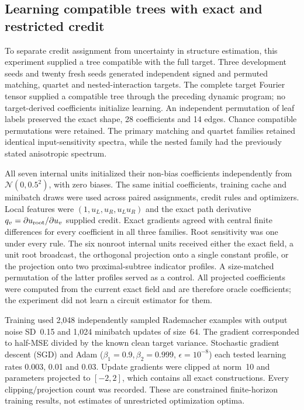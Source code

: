 \subsection{Learning compatible trees with exact and restricted credit}
\label{note:morphology_credit_learning}

To separate credit assignment from uncertainty in structure estimation, this experiment supplied a tree compatible with the full target. Three development seeds and twenty fresh seeds generated independent signed and permuted matching, quartet and nested-interaction targets. The complete target Fourier tensor supplied a compatible tree through the preceding dynamic program; no target-derived coefficients initialize learning. An independent permutation of leaf labels preserved the exact shape, 28 coefficients and 14 edges. Chance compatible permutations were retained. The primary matching and quartet families retained identical input-sensitivity spectra, while the nested family had the previously stated anisotropic spectrum.

All seven internal units initialized their non-bias coefficients independently from $\mathcal N(0,0.5^2)$, with zero biases. The same initial coefficients, training cache and minibatch draws were used across paired assignments, credit rules and optimizers. Local features were $(1,u_L,u_R,u_Lu_R)$ and the exact path derivative $q_v=\partial u_{\rm root}/\partial u_v$ supplied credit. Exact gradients agreed with central finite differences for every coefficient in all three families. Root sensitivity was one under every rule. The six nonroot internal units received either the exact field, a unit root broadcast, the orthogonal projection onto a single constant profile, or the projection onto two proximal-subtree indicator profiles. A size-matched permutation of the latter profiles served as a control. All projected coefficients were computed from the current exact field and are therefore oracle coefficients; the experiment did not learn a circuit estimator for them.

Training used 2,048 independently sampled Rademacher examples with output noise SD~0.15 and 1,024 minibatch updates of size~64. The gradient corresponded to half-MSE divided by the known clean target variance. Stochastic gradient descent (SGD) and Adam ($\beta_1=0.9,\beta_2=0.999$, $\epsilon=10^{-8}$) each tested learning rates 0.003, 0.01 and 0.03. Update gradients were clipped at norm~10 and parameters projected to $[-2,2]$, which contains all exact constructions. Every clipping/projection count was recorded. These are constrained finite-horizon training results, not estimates of unrestricted optimization optima.

